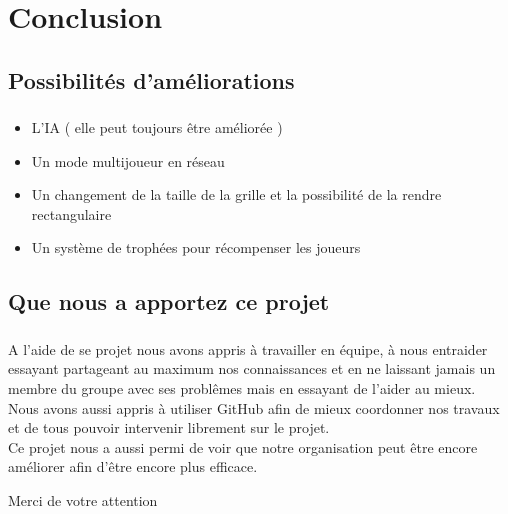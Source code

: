 \documentclass{beamer}
\begin{document}
\section{Conclusion}
\subsection{Possibilités d'améliorations}
\begin{frame}
\frametitle{\insertsubsection}
\framesubtitle{\insertsection}
\begin{itemize}
\item L'IA ( elle peut toujours être améliorée )
\item Un mode multijoueur en réseau
\item Un changement de la taille de la grille et la possibilité de la rendre rectangulaire
\item Un système de trophées pour récompenser les joueurs
\end{itemize}

\end{frame}
\subsection{Que nous a apportez ce projet}
\begin{frame}
\frametitle{\insertsubsection}
\framesubtitle{\insertsection}
A l'aide de se projet nous avons appris à travailler en équipe, à nous entraider essayant partageant au maximum nos connaissances et en ne laissant jamais un membre du groupe avec ses problêmes mais en essayant de l'aider au mieux.\\
Nous avons aussi appris à utiliser GitHub afin de mieux coordonner nos travaux et de tous pouvoir intervenir librement sur le projet.\\
Ce projet nous a aussi permi de voir que notre organisation peut être encore améliorer afin d'être encore plus efficace.

\end{frame}

\begin{frame}
\begin{center}
	Merci de votre attention
\end{center}
\end{frame}
\end{document}
